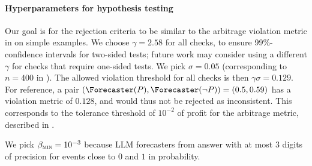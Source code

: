 \paragraph{Hyperparameters for hypothesis testing}
\label{cfc/app:frequentist-hyperparams}
Our goal is for the rejection criteria to be similar to the arbitrage violation metric in  on simple examples.
We choose $\gamma = 2.58$ for all checks, to ensure 99\%-confidence intervals for two-sided tests;
future work may consider using a different $\gamma$ for checks that require one-sided tests.
We pick $\sigma = 0.05$ (corresponding to $n = 400$ in ).
The allowed violation threshold for all checks is then $\gamma \sigma = 0.129$.
For reference, a \NegChecker{} pair $(\Forecaster(P), \Forecaster(\neg P)) = (0.5, 0.59)$ has a violation metric of $0.128$, and would thus not be rejected as inconsistent.
This  corresponds to the tolerance threshold of $10^{-2}$ of profit for the arbitrage metric, described in .

We pick $\beta_{\textsc{min}} = 10^{-3}$ because LLM forecasters from \citet{halawiApproachingHumanLevelForecasting2024} answer with at most 3 digits of precision for events close to $0$ and $1$ in probability.



